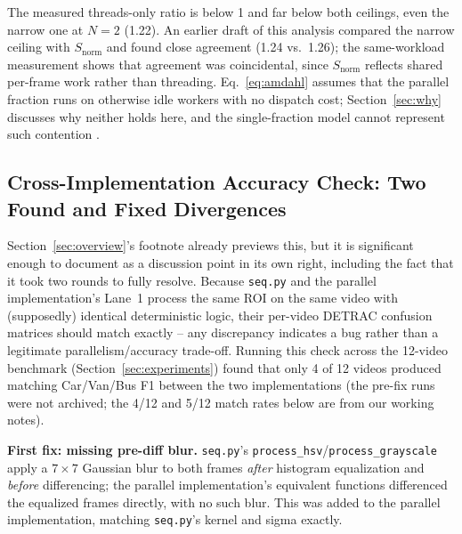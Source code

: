 \documentclass[conference]{IEEEtran}
\newcommand{\code}[1]{\texttt{#1}}
\begin{document}
The measured threads-only ratio is below 1 and far below both ceilings,
even the narrow one at $N=2$ (1.22). An earlier draft of this analysis
compared the narrow ceiling with $S_{\text{norm}}$ and found close
agreement (1.24 vs.\ 1.26); the same-workload measurement shows that
agreement was coincidental, since $S_{\text{norm}}$ reflects shared
per-frame work rather than threading. Eq.~\eqref{eq:amdahl} assumes that
the parallel fraction runs on otherwise idle workers with no dispatch
cost; Section~\ref{sec:why} discusses why neither holds here, and the
single-fraction model cannot represent such contention
\cite{poolla2023}.

\subsection{Cross-Implementation Accuracy Check: Two Found and Fixed Divergences}
\label{sec:crosscheck}
Section~\ref{sec:overview}'s footnote already previews this, but it is
significant enough to document as a discussion point in its own right,
including the fact that it took two rounds to fully resolve. Because
\code{seq.py} and the parallel implementation's Lane~1 process the same
ROI on the same video with (supposedly) identical deterministic logic,
their per-video DETRAC confusion matrices should match exactly -- any
discrepancy indicates a bug rather than a legitimate
parallelism/accuracy trade-off. Running this check across the 12-video
benchmark (Section~\ref{sec:experiments}) found that only 4 of 12 videos
produced matching Car/Van/Bus F1 between the two implementations (the
pre-fix runs were not archived; the 4/12 and 5/12 match rates below are
from our working notes).

\textbf{First fix: missing pre-diff blur.} \code{seq.py}'s
\code{process\_hsv}/\code{process\_grayscale} apply a $7\times7$
Gaussian blur to both frames \emph{after} histogram equalization and
\emph{before} differencing; the parallel implementation's equivalent
functions differenced the equalized frames directly, with no such blur.
This was added to the parallel implementation, matching \code{seq.py}'s
kernel and sigma exactly.
\end{document}
